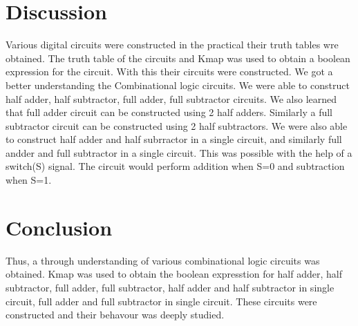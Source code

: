 \documentclass[a4paper, 12pt]{article}
\begin{document}
\section{Discussion}
Various digital circuits were constructed in the practical their truth tables wre obtained. 
The truth table of the circuits and Kmap was used to obtain a boolean expression for the circuit. With this their circuits were constructed.
We got a better understanding the Combinational logic circuits. We were able to construct half adder, half subtractor, full adder, full subtractor circuits.
We also learned that full adder circuit can be constructed using 2 half adders. Similarly a full subtractor circuit can be constructed using 2 half subtractors.
We were also able to construct half adder and half subrractor in a single circuit, and similarly full andder and full subtractor in a single circuit.
This was possible with the help of a switch(S) signal. The circuit would perform addition when S=0 and subtraction when S=1.
\section{Conclusion}
Thus, a through understanding of various combinational logic circuits was obtained. Kmap was used to obtain the boolean expresstion for
half adder, half subtractor, full adder, full subtractor, half adder and half subtractor in single circuit, full adder and full subtractor 
in single circuit. These circuits were constructed and their behavour was deeply studied.
\end{document}
